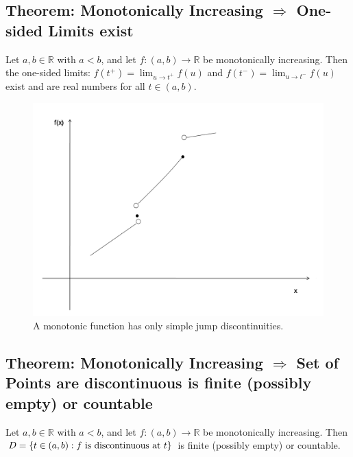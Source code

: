 \documentclass[11pt]{elegantbook}
\begin{document}
\subsection{Theorem: Monotonically Increasing $\Rightarrow$ One-sided Limits exist}
\begin{theorem}
    Let $a, b \in \mathbb{R}$ with $a < b$, and let $f : (a, b) \rightarrow \mathbb{R}$ be monotonically increasing. Then the one-sided limits: $f(t^+)=\lim_{u \rightarrow t^+}f(u)$ and $f(t^-)=\lim_{u \rightarrow t^-}f(u)$ exist and are real numbers for all $t \in (a, b)$.
\end{theorem}
\begin{center}\begin{figure}[htbp]
    \centering
    \includegraphics[scale=0.2]{SJD.png}
    \caption{A monotonic function has only simple jump discontinuities.}
    \label{}
\end{figure}\end{center}

\subsection{Theorem: Monotonically Increasing $\Rightarrow$ Set of Points are discontinuous is finite (possibly empty) or countable}
\begin{theorem}
    Let $a, b \in \mathbb{R}$ with $a < b$, and let $f : (a, b) \rightarrow \mathbb{R}$ be monotonically increasing. Then $D=\{t\in(a,b): f \textnormal{ is discontinuous at }t\}$ is finite (possibly empty) or countable.
\end{theorem}
\end{document}
